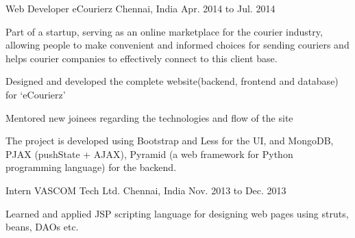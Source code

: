\begin{cventries}
  \cventry
    {Web Developer} %
    {eCourierz} %
    {Chennai, India} %
    {Apr. 2014 to Jul. 2014} %
    {
      \begin{cvitems} %
        \item {Part of a startup, serving as an online marketplace for the courier industry, allowing people to make convenient and informed choices for sending couriers and helps courier companies to effectively connect to this client base.}
        \item {Designed and developed the complete website(backend, frontend and database) for ‘eCourierz’}
        \item {Mentored new joinees regarding the technologies and flow of the site}
        \item {The project is developed using Bootstrap and Less for the UI, and MongoDB, PJAX (pushState + AJAX), Pyramid (a web framework for Python programming language) for the backend.}
      \end{cvitems}
    }

  \cventry
    {Intern} %
    {VASCOM Tech Ltd.} %
    {Chennai, India} %
    {Nov. 2013 to Dec. 2013} %
    {
      \begin{cvitems} %
        \item {Learned and applied JSP scripting language for designing web pages using struts, beans, DAOs etc.}
      \end{cvitems}
    }


\end{cventries}
